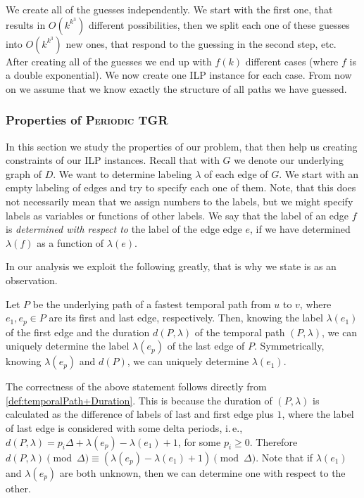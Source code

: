 \documentclass[a4paper,UKenglish,cleveref, autoref, thm-restate, anonymous]{lipics-v2021}
\newcommand{\ie}{i.\,e.,\ }
\newcommand{\deltaExact}{\textsc{Periodic TGR}}
\begin{document}
%
We create all of the guesses independently.
We start with the first one, that results in $O(k^{k^3})$ different possibilities, then we split each one of these guesses into $O(k^{k^3})$ new ones, that respond to the guessing in the second step, etc.
After creating all of the guesses we end up with $f(k)$ different cases (where $f$ is a double exponential).
We now create one ILP instance for each case.
From now on we assume that we know exactly the structure of all paths we have guessed.

\subsubsection{Properties of \deltaExact}

In this section we study the properties of our problem, that then help us creating constraints of our ILP instances.
Recall that with $G$ we denote our underlying graph of $D$. We want to determine labeling $\lambda$ of each edge of $G$.
We start with an empty labeling of edges and try to specify each one of them.
Note, that this does not necessarily mean that we assign numbers to the labels, but we might specify labels as variables or functions of other labels.
We say that the label of an edge $f$ is \emph{determined with respect to} the label of the edge edge $e$, if we have determined $\lambda(f)$ as a function of $\lambda(e)$. 

In our analysis we exploit the following greatly, that is why we state is as an observation.

\begin{observation}\label{obs:FirstLabelAndDuration}
    Let $P$ be the underlying path of a fastest temporal path from $u$ to $v$, where $e_1, e_p \in P$ are its first and last edge, respectively.
    Then, knowing the label $\lambda (e_1)$ of the first edge and the duration $d(P,\lambda)$ of the temporal path $(P,\lambda)$, we can uniquely determine the label $\lambda (e_p)$ of the last edge of $P$.
    Symmetrically, knowing $\lambda(e_p)$ and $d(P)$, we can uniquely determine $\lambda(e_1)$.
\end{observation}
The correctness of the above statement follows directly from \cref{def:temporalPath+Duration}. This is because the duration of $(P,\lambda)$ is calculated as the difference of labels of last and first edge plus $1$,
where the label of last edge is considered with some delta periods,
\ie $d(P,\lambda) = p_i \Delta + \lambda(e_p) - \lambda (e_1) + 1$, for some $p_i \geq 0$.
Therefore $d(P,\lambda) \pmod \Delta \equiv  (\lambda(e_p) - \lambda (e_1) + 1) \pmod \Delta$.
Note that if $\lambda(e_1)$ and $\lambda(e_p)$ are both unknown, then we can determine one with respect to the other.
\end{document}
